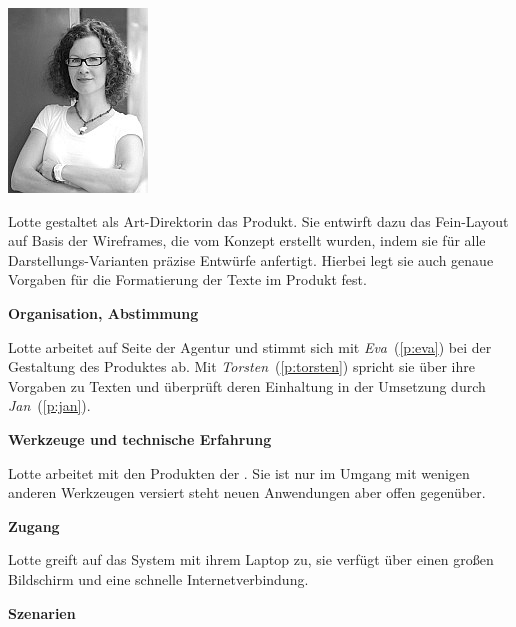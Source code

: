 \begin{multicols}{2}

\begin{center}
\includegraphics[width=0.5\columnwidth]{media/lotte.jpg}
\end{center}


Lotte gestaltet als Art-Direktorin das Produkt. Sie entwirft dazu das Fein-Layout auf Basis der Wireframes, die vom Konzept erstellt wurden, indem sie für alle Darstellungs-Varianten präzise Entwürfe anfertigt. Hierbei legt sie auch genaue Vorgaben für die Formatierung der Texte im Produkt fest.

\textbf{Organisation, Abstimmung}

Lotte arbeitet auf Seite der Agentur und stimmt sich mit \emph{Eva}~(\ref{p:eva}) bei der Gestaltung des Produktes ab. Mit \emph{Torsten}~(\ref{p:torsten}) spricht sie über ihre Vorgaben zu Texten und überprüft deren Einhaltung in der Umsetzung durch \emph{Jan}~(\ref{p:jan}).

\textbf{Werkzeuge und technische Erfahrung}

Lotte arbeitet mit den Produkten der . Sie ist nur im Umgang mit wenigen anderen Werkzeugen versiert steht neuen Anwendungen aber offen gegenüber.

\textbf{Zugang}

Lotte greift auf das System mit ihrem Laptop zu, sie verfügt über einen großen Bildschirm und eine schnelle Internetverbindung.

\columnbreak

\textbf{Szenarien}


\end{multicols}
